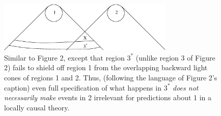 \documentclass[aps,prc,twocolumn]{revtex4}
\begin{document}
\begin{figure}[t]
\begin{center}
\includegraphics[width=3.3in,clip]{./fig3.eps}
\end{center}
\caption{
\label{fig3}
Similar to Figure 2, except that region $3^*$ (unlike region 3 of
Figure 2) fails to shield off region 1 from the overlapping backward
light cones of regions 1 and 2.  Thus, (following the language of
Figure 2's caption) even full specification of  what happens in $3^*$ 
\emph{does not necessarily make} events in 2 irrelevant for 
predictions about 1 in a locally causal theory.  
}
\end{figure}
\end{document}
